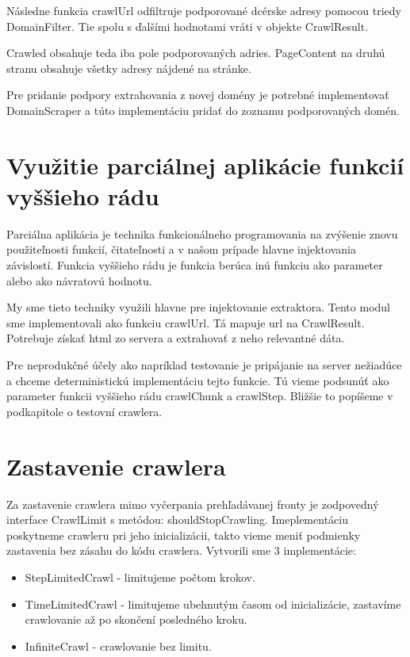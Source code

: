 Následne funkcia crawlUrl odfiltruje podporované dcérske adresy pomocou triedy DomainFilter. Tie spolu s ďalšími hodnotami vráti v objekte CrawlResult. 

Crawled obsahuje teda iba pole podporovaných adries. PageContent na druhú stranu obsahuje všetky adresy nájdené na stránke. 

Pre pridanie podpory extrahovania z novej domény je potrebné implementovať DomainScraper a túto implementáciu pridať do zoznamu podporovaných domén. 


\section{Využitie parciálnej aplikácie funkcií vyššieho rádu}
Parciálna aplikácia je technika funkcionálneho programovania na zvýšenie znovu použiteľnosti funkcií, čitateľnosti a v našom prípade hlavne injektovania závislostí. Funkcia vyššieho rádu je funkcia berúca inú funkciu ako parameter alebo ako návratovú hodnotu. 

My sme tieto techniky využili hlavne pre injektovanie extraktora. Tento modul sme implementovali ako funkciu crawlUrl. Tá mapuje url na CrawlResult. Potrebuje získať html zo servera a extrahovať z neho relevantné dáta. 

Pre neprodukčné účely ako napríklad testovanie je pripájanie na server nežiadúce a chceme deterministickú implementáciu tejto funkcie. Tú vieme podsunúť ako parameter funkcii vyššieho rádu crawlChunk a crawlStep. Bližšie to popíšeme v podkapitole o testovní crawlera. 

\section{Zastavenie crawlera}
Za zastavenie crawlera mimo vyčerpania prehľadávanej fronty je zodpovedný interface CrawlLimit s metódou: shouldStopCrawling. Imeplementáciu poskytneme crawleru pri jeho inicializácii, takto vieme meniť podmienky zastavenia bez zásahu do kódu crawlera. Vytvorili sme 3 implementácie: 

\begin{itemize}
    \item StepLimitedCrawl - limitujeme počtom krokov.
    \item TimeLimitedCrawl - limitujeme ubehnutým časom od inicializácie, zastavíme crawlovanie až po skončení posledného kroku. 
    \item InfiniteCrawl - crawlovanie bez limitu.
\end{itemize}


